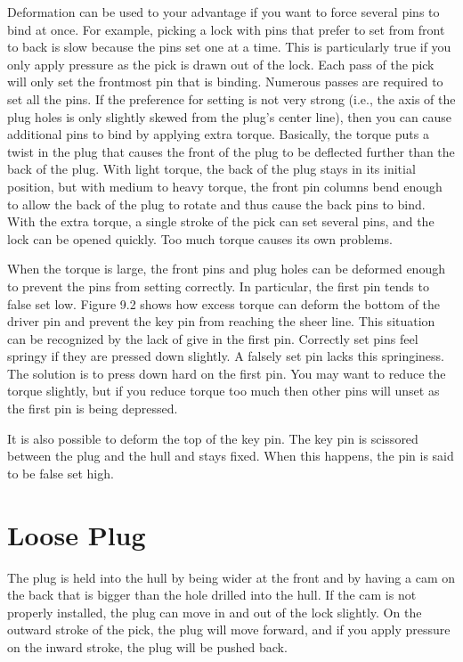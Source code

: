 Deformation can be used to your advantage if you want to force several pins to bind at 
once. For example, picking a lock with pins that prefer to set from front to back is slow 
because the pins set one at a time. This is particularly true if you only apply pressure as 
the pick is drawn out of the lock. Each pass of the pick will only set the frontmost pin that 
is binding. Numerous passes are required to set all the pins. If the preference for setting is 
not very strong (i.e., the axis of the plug holes is only slightly skewed from the plug's center 
line), then you can cause additional pins to bind by applying extra torque. Basically, the 
torque puts a twist in the plug that causes the front of the plug to be deflected further than 
the back of the plug. With light torque, the back of the plug stays in its initial position, but 
with medium to heavy torque, the front pin columns bend enough to allow the back of the 
plug to rotate and thus cause the back pins to bind. With the extra torque, a single stroke 
of the pick can set several pins, and the lock can be opened quickly. Too much torque causes 
its own problems. 

When the torque is large, the front pins and plug holes can be deformed enough to prevent 
the pins from setting correctly. In particular, the first pin tends to false set low. Figure 9.2 
shows how excess torque can deform the bottom of the driver pin and prevent the key pin 
from reaching the sheer line. This situation can be recognized by the lack of give in the 
first pin. Correctly set pins feel springy if they are pressed down slightly. A falsely set pin 
lacks this springiness. The solution is to press down hard on the first pin. You may want to 
reduce the torque slightly, but if you reduce torque too much then other pins will unset as 
the first pin is being depressed. 

It is also possible to deform the top of the key pin. The key pin is scissored between the 
plug and the hull and stays fixed. When this happens, the pin is said to be false set high.

\section{Loose Plug }
The plug is held into the hull by being wider at the front and by having a cam on the back 
that is bigger than the hole drilled into the hull. If the cam is not properly installed, the 
plug can move in and out of the lock slightly. On the outward stroke of the pick, the plug 
will move forward, and if you apply pressure on the inward stroke, the plug will be pushed 
back. 

